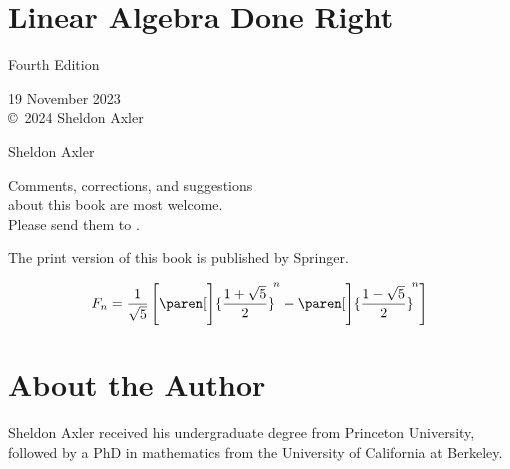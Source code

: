 \setcounter{secnumdepth}{-1}


\setcounter{page}{0}

\chapter{Linear Algebra Done Right}

\thispagestyle{empty}

\begin{center}

Fourth Edition

\medskip

19 November 2023
\\\copyright\ 2024 Sheldon Axler

\vfill

{\huge
Sheldon Axler}

\vfill

Comments, corrections, and suggestions\\about this book are most welcome.\\Please send them to .

\vfill

The print version of this book is published by Springer.

\bigskip

\end{center}

\CrCom


\vfill

{

\[
F_n = \frac{1}{\sqrt{5}} \, \Biggl[ \paren[\Bigg]{ \frac{1 + \sqrt{5}}{2} }^{\!n}
-\paren[\Bigg]{ \frac{1 - \sqrt{5}}{2} }^{\!n} \Biggr]
\]}


\setcounter{page}{4}

\chapter{About the Author}

Sheldon Axler received his undergraduate degree from Princeton University, followed by a PhD in mathematics from the University of California at Berkeley.


